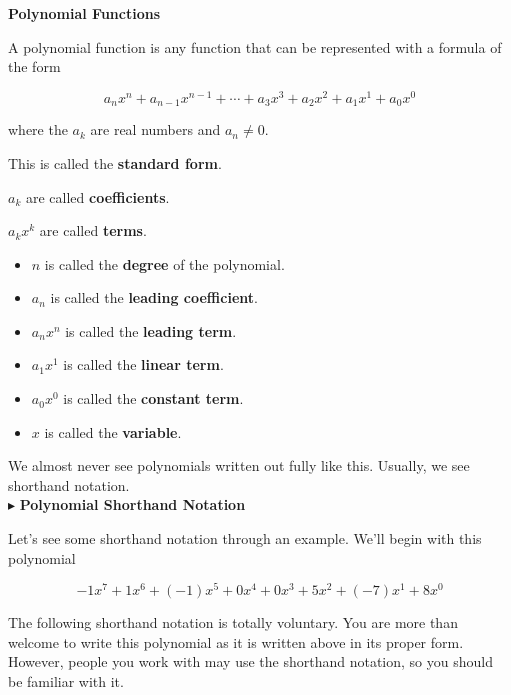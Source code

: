 \documentclass{ximera}
\begin{document}
\begin{definition} \textbf{\textcolor{green!50!black}{Polynomial Functions}} 

A polynomial function is any function that can be represented with a formula of the form

\[    a_n x^n + a_{n-1} x^{n-1} + \cdots + a_3 x^3 + a_2 x^2 + a_1 x^1 + a_0 x^0      \]

where the $a_k$ are real numbers and $a_n \ne 0$.

This is called the \textbf{standard form}.

$a_k$ are called \textbf{coefficients}.

$a_k x^k$ are called \textbf{terms}.



\begin{itemize}
\item $n$ is called the \textbf{degree} of the polynomial.
\item $a_n$ is called the \textbf{leading coefficient}.
\item $a_n x^n$ is called the \textbf{leading term}.
\item $a_1 x^1$ is called the \textbf{linear term}.
\item $a_0 x^0$ is called the \textbf{constant term}.
\item $x$ is called the \textbf{variable}.
\end{itemize}


\end{definition}




We almost never see polynomials written out fully like this.  Usually, we see shorthand notation.   \\



$\blacktriangleright$ \textbf{\textcolor{blue!55!black}{Polynomial Shorthand Notation}}



Let's see some shorthand notation through an example.  We'll begin with this polynomial


\[  -1 x^7 + 1 x^6 + (-1) x^5 + 0 x^4 + 0 x^3 + 5 x^2 + (-7) x^1 + 8 x^0              \]



The following shorthand notation is totally voluntary.  You are more than welcome to write this polynomial as it is written above in its proper form. However, people you work with may use the shorthand notation, so you should be familiar with it.
\end{document}
